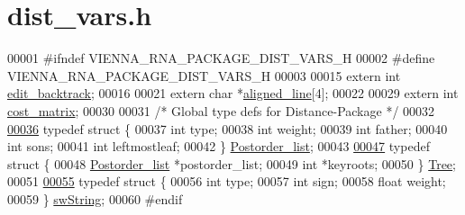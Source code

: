 \hypertarget{dist__vars_8h_source}{}\section{dist\+\_\+vars.\+h}
\label{dist__vars_8h_source}

\begin{DoxyCode}
00001 \textcolor{preprocessor}{#ifndef VIENNA\_RNA\_PACKAGE\_DIST\_VARS\_H}
00002 \textcolor{preprocessor}{#define VIENNA\_RNA\_PACKAGE\_DIST\_VARS\_H}
00003 
00015 \textcolor{keyword}{extern} \textcolor{keywordtype}{int}   \hyperlink{dist__vars_8h_aa03194c513af6b860e7b33e370b82bdb}{edit\_backtrack};
00016 
00021 \textcolor{keyword}{extern} \textcolor{keywordtype}{char} *\hyperlink{dist__vars_8h_ac1605fe3448ad0a0b809c4fb8f6a854a}{aligned\_line}[4];
00022 
00029 \textcolor{keyword}{extern} \textcolor{keywordtype}{int}  \hyperlink{dist__vars_8h_ab65d8ff14c6937612212526a60f59b3c}{cost\_matrix};
00030 
00031 \textcolor{comment}{/*  Global type defs for Distance-Package */}
00032 
\hypertarget{dist__vars_8h_source.tex_l00036}{}\hyperlink{structPostorder__list}{00036} \textcolor{keyword}{typedef} \textcolor{keyword}{struct }\{
00037                  \textcolor{keywordtype}{int}  type;
00038                  \textcolor{keywordtype}{int}  weight;
00039                  \textcolor{keywordtype}{int}  father;
00040                  \textcolor{keywordtype}{int}  sons;
00041                  \textcolor{keywordtype}{int}  leftmostleaf;
00042                \} \hyperlink{structPostorder__list}{Postorder\_list};
00043 
\hypertarget{dist__vars_8h_source.tex_l00047}{}\hyperlink{structTree}{00047} \textcolor{keyword}{typedef} \textcolor{keyword}{struct }\{
00048                  \hyperlink{structPostorder__list}{Postorder\_list} *postorder\_list;
00049                  \textcolor{keywordtype}{int}            *keyroots;
00050                \} \hyperlink{structTree}{Tree};
00051 
\hypertarget{dist__vars_8h_source.tex_l00055}{}\hyperlink{structswString}{00055} \textcolor{keyword}{typedef} \textcolor{keyword}{struct }\{
00056                  \textcolor{keywordtype}{int}    type;
00057                  \textcolor{keywordtype}{int}    sign;
00058                  \textcolor{keywordtype}{float}  weight;
00059                \} \hyperlink{structswString}{swString};
00060 \textcolor{preprocessor}{#endif}
\end{DoxyCode}
